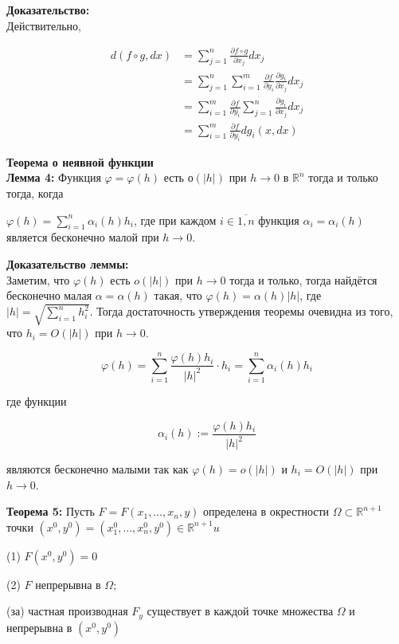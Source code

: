 \documentclass[a4paper,12pt]{article} %
\begin{document}
\textbf{Доказательство:}\\
Действительно,

$$
\begin{aligned}
d(f \circ g, d x) & =\sum_{j=1}^{n} \frac{\partial f \circ g}{\partial x_{j}} d x_{j} \\
& =\sum_{j=1}^{n} \sum_{i=1}^{m} \frac{\partial f}{\partial y_{i}} \frac{\partial g_{i}}{\partial x_{j}} d x_{j} \\
& =\sum_{i=1}^{m} \frac{\partial f}{\partial y_{i}} \sum_{j=1}^{n} \frac{\partial g_{i}}{\partial x_{j}} d x_{j} \\
& =\sum_{i=1}^{m} \frac{\partial f}{\partial y_{i}} d g_{i}(x, d x)
\end{aligned}
$$

\textbf{Теорема о неявной функции}\\
\textbf{Лемма 4:} Функция $\varphi=\varphi(h)$ есть $о(|h|)$ при $h \rightarrow 0$ в $\mathbb{R}^{n}$ тогда и только тогда, когда

$\varphi(h)=\sum_{i=1}^n \alpha_i(h) h_i$, где при каждом $i \in \overline{1, n}$ функция $\alpha_i=\alpha_i(h)$ является
бесконечно малой при $h \rightarrow 0$.

\textbf{Доказательство леммы:}\\
Заметим, что $\varphi(h)$ есть $o(|h|)$ при $h \rightarrow 0$ тогда и только, тогда найдётся бесконечно малая $\alpha=\alpha(h)$ такая, что $\varphi(h)=\alpha(h)|h|$, где $|h|=\sqrt{\sum_{i=1}^{n} h_{i}^{2}}$. Тогда достаточность утверждения теоремы очевидна из того, что $h_{i}=O(|h|)$ при $h \rightarrow 0$.

$$
\varphi(h)=\sum_{i=1}^{n} \frac{\varphi(h) h_{i}}{|h|^{2}} \cdot h_{i}=\sum_{i=1}^{n} \alpha_{i}(h) h_{i}
$$

где функции

$$
\alpha_{i}(h):=\frac{\varphi(h) h_{i}}{|h|^{2}}
$$

являются бесконечно малыми так как $\varphi(h)=o(|h|)$ и $h_{i}=O(|h|)$ при $h \rightarrow 0$.

\textbf{Теорема 5:} Пусть $F=F\left(x_{1}, \ldots, x_{n}, y\right)$ определена в окрестности $\Omega \subset \mathbb{R}^{n+1}$ точки $\left(x^{0}, y^{0}\right)=\left(x_{1}^{0}, \ldots, x_{n}^{0}, y^{0}\right) \in \mathbb{R}^{n+1} u$

(1) $F\left(x^{0}, y^{0}\right)=0$

(2) $F$ непрерывна в $\Omega$;

(за) частная производная $F_{y}$ существует в каждой точке множества $\Omega$ и непрерывна в $\left(x^{0}, y^{0}\right)$
\end{document}
